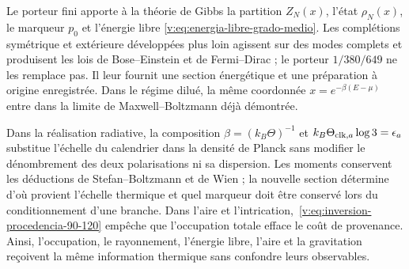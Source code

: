 Le porteur fini apporte à la théorie de Gibbs la partition
$Z_N(x)$, l’état $\rho_N(x)$, le marqueur $p_0$ et l’énergie libre
\eqref{v:eq:energia-libre-grado-medio}. Les complétions symétrique et
extérieure développées plus loin agissent sur des modes complets et produisent
les lois de Bose--Einstein et de Fermi--Dirac ; le porteur $1/380/649$ ne les
remplace pas. Il leur fournit une section énergétique et une préparation à origine
enregistrée. Dans le régime dilué, la même coordonnée
$x=e^{-\beta(E-\mu)}$ entre dans la limite de Maxwell--Boltzmann déjà démontrée.

Dans la réalisation radiative, la composition
$\beta=(k_B\Theta)^{-1}$ et
$k_B\Theta_{{\rm clk},a}\log3=\epsilon_a$ substitue l’échelle du calendrier
dans la densité de Planck sans modifier le dénombrement des deux polarisations ni sa
dispersion. Les moments conservent les déductions de Stefan--Boltzmann et de
Wien ; la nouvelle section détermine d’où provient l’échelle thermique et quel
marqueur doit être conservé lors du conditionnement d’une branche. Dans l’aire et
l’intrication,~\eqref{v:eq:inversion-procedencia-90-120} empêche que
l’occupation totale efface le coût de provenance. Ainsi, l’occupation, le rayonnement,
l’énergie libre, l’aire et la gravitation reçoivent la même information thermique sans
confondre leurs observables.
